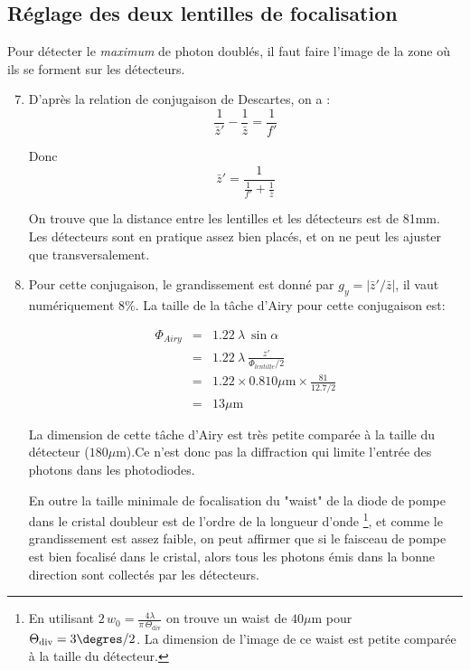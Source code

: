 \documentclass[twocolumn, 10pt]{article}
\begin{document}
\subsection{Réglage des deux lentilles de focalisation}
\par Pour détecter le \textit{maximum} de photon doublés, il faut faire l'image de la zone où ils se forment sur les détecteurs.

\begin{enumerate}
\setcounter{enumi}{6}
    \item \par D'après la relation de conjugaison de Descartes, on a :
\[ \frac{1}{\bar{z}'} - \frac{1}{\bar{z}} = \frac{1}{f'} \]
    \par Donc 
\[ \bar{z}' = \frac{1}{\frac{1}{f'} + \frac{1}{\bar{z}}} \]
    \par On trouve que la distance entre les lentilles et les détecteurs est de 81mm. Les détecteurs sont en pratique assez bien placés, et on ne peut les ajuster que transversalement.

    \item \par Pour cette conjugaison, le grandissement est donné par $g_y = |\bar{z}' / \bar{z}|$, il vaut numériquement 8\%. La taille de la tâche d'Airy pour cette conjugaison est:

\begin{align*}
    \Phi_{Airy} &=& 1.22 \ \lambda \ \sin \alpha \\
        &=& 1.22 \ \lambda \ \frac{z'}{\Phi_{lentille}/2} \\
        &=& 1.22 \times 0.810 \mu \mathrm{m} \times \frac{81}{12.7/2} \\
        &=& 13 \mu \mathrm{m}
\end{align*}

    \par La dimension de cette tâche d'Airy est très petite comparée à la taille du détecteur ($180 \mu \mathrm{m}$).Ce n'est donc pas la diffraction qui limite l'entrée des photons dans les photodiodes.
    \par En outre la taille minimale de focalisation du "waist" de la diode de pompe dans le cristal doubleur est de l'ordre de la longueur d'onde \footnote{En utilisant $2\,w_0 = \frac{4\lambda}{\pi\, \Theta_{\mathrm{div}}}$ on trouve un waist de $40 \mu \mathrm{m}$ pour $\Theta_{\mathrm{div}}=3\degres/2$. La dimension de l'image de ce waist est petite comparée à la taille du détecteur.}, et comme le grandissement est assez faible, on peut affirmer que si le faisceau de pompe est bien focalisé dans le cristal, alors tous les photons émis dans la bonne direction sont collectés par les détecteurs.

\end{enumerate}
\end{document}
